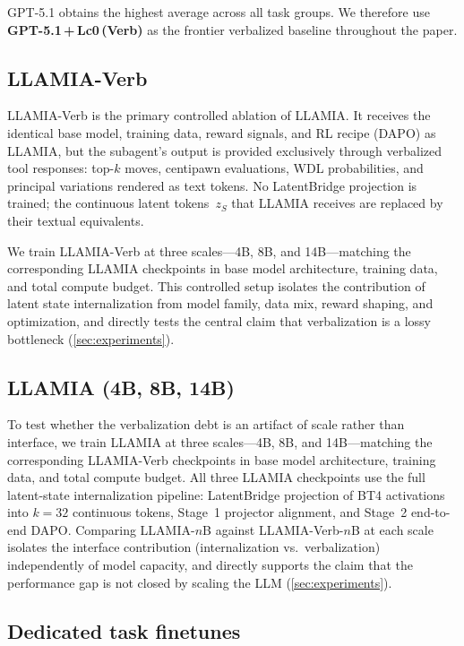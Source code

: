 GPT-5.1 obtains the highest average across all task groups.
We therefore use \textbf{GPT-5.1\,+\,Lc0\,(Verb)} as the frontier
verbalized baseline throughout the paper.

\subsection{LLAMIA-Verb}
\label{sec:app_baseline_verb}

LLAMIA-Verb is the primary controlled ablation of LLAMIA.
It receives the identical base model, training data, reward signals, and RL
recipe (DAPO) as LLAMIA, but the subagent's output is provided exclusively
through verbalized tool responses: top-$k$ moves, centipawn evaluations, WDL
probabilities, and principal variations rendered as text tokens.
No LatentBridge projection is trained; the continuous latent
tokens~$z_S$ that LLAMIA receives are replaced by their textual equivalents.

We train LLAMIA-Verb at three scales---4B, 8B, and 14B---matching the
corresponding LLAMIA checkpoints in base model architecture, training data,
and total compute budget.
This controlled setup isolates the contribution of latent state
internalization from model family, data mix, reward shaping, and
optimization, and directly tests the central claim that verbalization is a
lossy bottleneck (\cref{sec:experiments}).

\subsection{LLAMIA (4B, 8B, 14B)}
\label{sec:app_baseline_llamia_scale}

To test whether the verbalization debt is an artifact of scale rather than interface, we train LLAMIA at three scales---4B, 8B, and 14B---matching the corresponding LLAMIA-Verb checkpoints in base model architecture, training data, and total compute budget.
All three LLAMIA checkpoints use the full latent-state internalization pipeline: LatentBridge projection of BT4 activations into $k{=}32$ continuous tokens, Stage~1 projector alignment, and Stage~2 end-to-end DAPO.
Comparing LLAMIA-$n$B against LLAMIA-Verb-$n$B at each scale isolates the interface contribution (internalization vs.\ verbalization) independently of model capacity, and directly supports the claim that the performance gap is not closed by scaling the LLM (\cref{sec:experiments}).

\subsection{Dedicated task finetunes}
\label{sec:app_baseline_experts}

